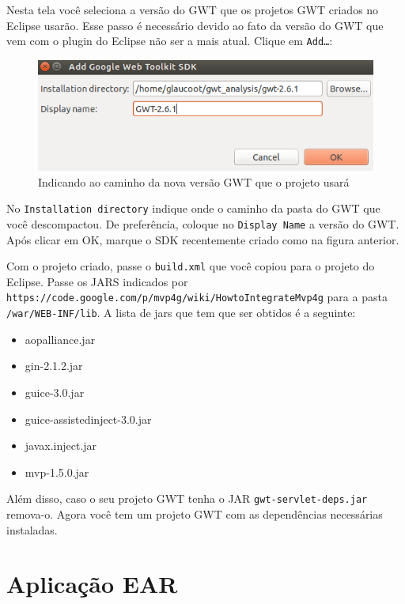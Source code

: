 Nesta tela você seleciona a versão do GWT que os projetos GWT criados no Eclipse usarão. Esse passo é necessário devido ao fato da
versão do GWT que vem com o plugin do Eclipse não ser a mais atual. Clique em \texttt{Add\ldots}:

\begin{figure}[H]
	\centering
	\includegraphics[scale=0.6=5]{files/imgs/gwt-03.png}
	\caption{Indicando ao caminho da nova versão GWT que o projeto usará}
	\label{gwt03}
\end{figure}

No \texttt{Installation directory} indique onde o caminho da pasta do GWT que você descompactou. De preferência, coloque no
\texttt{Display Name} a versão do GWT. Após clicar em OK, marque o SDK recentemente criado como na figura anterior.

Com o projeto criado, passe o \texttt{build.xml} que você copiou para o projeto do Eclipse. Passe os JARS indicados por
\texttt{https://code.google.com/p/mvp4g/wiki/HowtoIntegrateMvp4g} para a pasta
\texttt{/war/WEB-INF/lib}. A lista de jars que tem que ser obtidos é a seguinte:

\begin{itemize}
  \item aopalliance.jar
  \item gin-2.1.2.jar
  \item guice-3.0.jar
  \item guice-assistedinject-3.0.jar
  \item javax.inject.jar
  \item mvp-1.5.0.jar
\end{itemize}

Além disso, caso o seu projeto GWT tenha o JAR \texttt{gwt-servlet-deps.jar} remova-o. Agora você tem um projeto GWT com as
dependências necessárias instaladas.

\section{Aplicação EAR}

